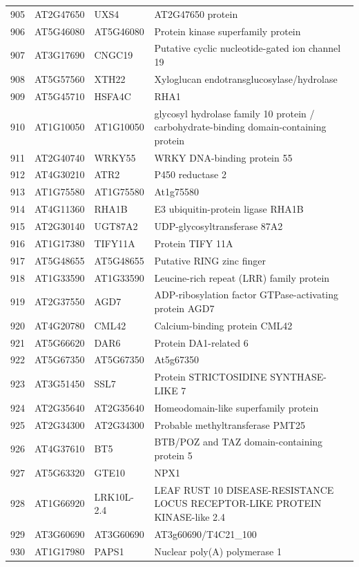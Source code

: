 \documentclass[11pt]{article}
\begin{document}
\begin{center}
\begin{tabular}{rlll}
905 & AT2G47650 & UXS4 & AT2G47650 protein\\
906 & AT5G46080 & AT5G46080 & Protein kinase superfamily protein\\
907 & AT3G17690 & CNGC19 & Putative cyclic nucleotide-gated ion channel 19\\
908 & AT5G57560 & XTH22 & Xyloglucan endotransglucosylase/hydrolase\\
909 & AT5G45710 & HSFA4C & RHA1\\
910 & AT1G10050 & AT1G10050 & glycosyl hydrolase family 10 protein / carbohydrate-binding domain-containing protein\\
911 & AT2G40740 & WRKY55 & WRKY DNA-binding protein 55\\
912 & AT4G30210 & ATR2 & P450 reductase 2\\
913 & AT1G75580 & AT1G75580 & At1g75580\\
914 & AT4G11360 & RHA1B & E3 ubiquitin-protein ligase RHA1B\\
915 & AT2G30140 & UGT87A2 & UDP-glycosyltransferase 87A2\\
916 & AT1G17380 & TIFY11A & Protein TIFY 11A\\
917 & AT5G48655 & AT5G48655 & Putative RING zinc finger\\
918 & AT1G33590 & AT1G33590 & Leucine-rich repeat (LRR) family protein\\
919 & AT2G37550 & AGD7 & ADP-ribosylation factor GTPase-activating protein AGD7\\
920 & AT4G20780 & CML42 & Calcium-binding protein CML42\\
921 & AT5G66620 & DAR6 & Protein DA1-related 6\\
922 & AT5G67350 & AT5G67350 & At5g67350\\
923 & AT3G51450 & SSL7 & Protein STRICTOSIDINE SYNTHASE-LIKE 7\\
924 & AT2G35640 & AT2G35640 & Homeodomain-like superfamily protein\\
925 & AT2G34300 & AT2G34300 & Probable methyltransferase PMT25\\
926 & AT4G37610 & BT5 & BTB/POZ and TAZ domain-containing protein 5\\
927 & AT5G63320 & GTE10 & NPX1\\
928 & AT1G66920 & LRK10L-2.4 & LEAF RUST 10 DISEASE-RESISTANCE LOCUS RECEPTOR-LIKE PROTEIN KINASE-like 2.4\\
929 & AT3G60690 & AT3G60690 & AT3g60690/T4C21\_100\\
930 & AT1G17980 & PAPS1 & Nuclear poly(A) polymerase 1\\

\end{tabular}
\end{center}
\end{document}
